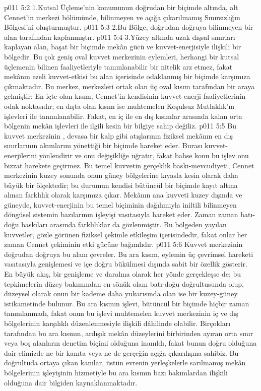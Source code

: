 \vs p011 5:2 1.Kutsal Üçleme’nin konumunun doğrudan bir biçimde altında, alt Cennet’in merkezi bölümünde, bilinmeyen ve açığa çıkarılmamış Sınırsızlığın Bölgesi’ni oluşturmuştur.
\vs p011 5:3 2.\bibnobreakspace Bu Bölge, doğrudan doğruya bilinmeyen bir alan tarafından kaplanmıştır.
\vs p011 5:4 3.\bibnobreakspace Yüzey altında uzak dışsal sınırları kaplayan alan, başat bir biçimde mekân gücü ve kuvvet\hyp{}enerjisiyle ilişkili bir bölgedir. Bu çok geniş oval kuvvet merkezinin eylemleri, herhangi bir kutsal üçlemenin bilinen faaliyetleriyle tanımlanabilir bir nitelik arz etmez, fakat mekânın ezeli kuvvet\hyp{}etkisi bu alan içerisinde odaklanmış bir biçimde karşımıza çıkmaktadır. Bu merkez, merkezleri ortak olan üç oval kısım tarafından bir araya gelmiştir: En içte olan kısım, Cennet’in kendisinin kuvvet\hyp{}enerji faaliyetlerinin odak noktasıdır; en dışta olan kısım ise muhtemelen Koşulsuz Mutlaklık’ın işlevleri ile tanımlanabilir. Fakat, en iç ile en dış kısımlar arasında kalan orta bölgenin mekân işlevleri ile ilgili kesin bir bilgiye sahip değiliz.
\vs p011 5:5 Bu kuvvet merkezinin , devasa bir kalp gibi atışlarının fiziksel mekânın en dış sınırlarının akımlarını yönettiği bir biçimde hareket eder. Burası kuvvet\hyp{}enerjilerini yönlendirir ve onu değişikliğe uğratır, fakat bahse konu bu işlev onu bizzat harekete geçirmez. Bu temel kuvvetin gerçeklik baskı\hyp{}mevcudiyeti, Cennet merkezinin kuzey sonunda onun güney bölgelerine kıyasla kesin olarak daha büyük bir ölçektedir; bu durumun kendisi bütüncül bir biçimde kayıt altına alınan farklılık olarak karşımıza çıkar. Mekânın ana kuvveti kuzey dışında ve güneyde, kuvvet\hyp{}enerjinin bu temel biçiminin dağılımıyla iniltili bilinmeyen döngüsel sistemin bazılarının işleyişi vasıtasıyla hareket eder. Zaman zaman batı\hyp{}doğu baskıları arasında farklılıklar da gözlenmiştir. Bu bölgeden yayılan kuvvetler, gözle görünen fiziksel çekimle etkileşim içerisindedir, fakat onlar her zaman Cennet çekiminin etki gücüne bağımlıdır.
\vs p011 5:6 Kuvvet merkezinin doğrudan doğruya bu alanı çevreler. Bu ara kısım, eylemin üç çevrimsel hareketi vasıtasıyla genişlemesi ve içe doğru bükülmesi dışında sabit bir özellik gösterir. En büyük akış, bir genişleme ve daralma olarak her yönde gerçekleşse de; bu tepkimelerin düzey bakımından en sönük olanı batı\hyp{}doğu doğrultusunda olup, düzeysel olarak onun bir kademe daha yukarısında olan ise bir kuzey\hyp{}güney istikametinde bulunur. Bu ara kısmın işlevi, bütüncül bir biçimde hiçbir zaman tanımlanmadı, fakat onun bu işlevi muhtemelen kuvvet merkezinin iç ve dış bölgelerinin karşılıklı düzenlenmesiyle ilişkili dâhilinde olabilir. Birçokları tarafından bu ara kısmın, ardışık mekân düzeylerini birbirinden ayıran orta sınır veya boş alanların denetim biçimi olduğuna inanıldı, fakat bunun doğru olduğuna dair elimizde ne bir kanıta veya ne de gerçeğin açığa çıkarılışına sahibiz. Bu doğrultuda ortaya çıkan kanılar, üstün evrenin yerleşkelerle sarılmamış mekân bölgelerinin işleyişinin hizmetiyle bu ara kısmın bazı bakımlardan ilişkili olduğuna dair bilgiden kaynaklanmaktadır.
